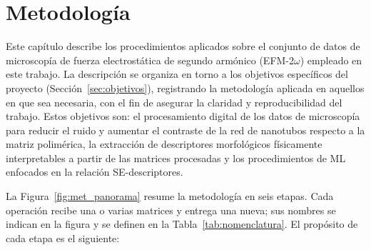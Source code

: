 \chapter{Metodología}

Este capítulo describe los procedimientos aplicados sobre el conjunto de datos de microscopía de fuerza electrostática de segundo armónico (EFM-2$\omega$) empleado en este trabajo. La descripción se organiza en torno a los objetivos específicos del proyecto (Sección~\ref{sec:objetivos}), registrando la metodología aplicada en aquellos en que sea necesaria, con el fin de asegurar la claridad y reproducibilidad del trabajo. Estos objetivos son: el procesamiento digital de los datos de microscopía para reducir el ruido y aumentar el contraste de la red de nanotubos respecto a la matriz polimérica, la extracción de descriptores morfológicos físicamente interpretables a partir de las matrices procesadas y los procedimientos de ML enfocados en la relación SE-descriptores.

La Figura~\ref{fig:met_panorama} resume la metodología en seis etapas. Cada operación recibe una o varias matrices y entrega una nueva; sus nombres se indican en la figura y se definen en la Tabla~\ref{tab:nomenclatura}. El propósito de cada etapa es el siguiente:

